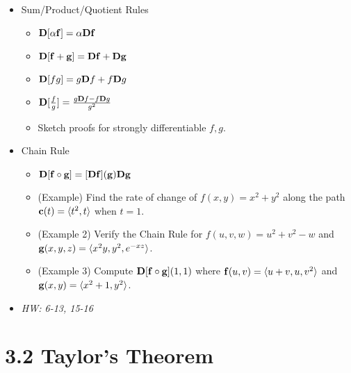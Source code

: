 \documentclass[11pt]{article}
\begin{document}
\begin{itemize}
  \item Sum/Product/Quotient Rules
    \begin{itemize}
      \item \(\mathbf{D}[\alpha \mathbf{f}]=\alpha\mathbf{D}\mathbf{f}\)
      \item \(\mathbf{D}[\mathbf{f}+\mathbf{g}]=\mathbf{D}\mathbf{f}+\mathbf{D}\mathbf{g}\)
      \item
        \(
          \mathbf{D}[fg]=g\mathbf{D}f + f\mathbf{D}g
        \)
      \item
        \(
          \mathbf{D}[\frac{f}{g}]
            =
          \frac{
            g\mathbf{D}f - f\mathbf{D}g
          }{
            g^2
          }
        \)
      \item Sketch proofs for strongly differentiable \(f,g\).
    \end{itemize}
  \item Chain Rule
    \begin{itemize}
      \item
        \(
          \mathbf{D} [\mathbf{f}\circ \mathbf{g}]
            =
          [\mathbf{D}\mathbf{f}](\mathbf{g})\mathbf{D}\mathbf{g}
        \)
      \item
        (Example) Find the rate of change of \(f(x,y)=x^2+y^2\) along
        the path \(\mathbf{c}(t)=\langle t^2,t\rangle\) when \(t=1\).
      \item
        (Example 2) Verify the Chain Rule for \(f(u,v,w)=u^2+v^2-w\)
        and \(\mathbf{g}(x,y,z)=\langle x^2y,y^2,e^{-xz}\rangle\).
      \item
        (Example 3) Compute \(\mathbf{D}[\mathbf{f}\circ\mathbf{g}](1,1)\) where
        \(\mathbf{f}(u,v)=\langle u+v,u,v^2\rangle\) and \(\mathbf{g}(x,y)=\langle x^2+1,y^2\rangle\).
    \end{itemize}
  \item\textit{
    HW: 6-13, 15-16
  }
\end{itemize}


\section*{3.2 Taylor's Theorem}
\end{document}

